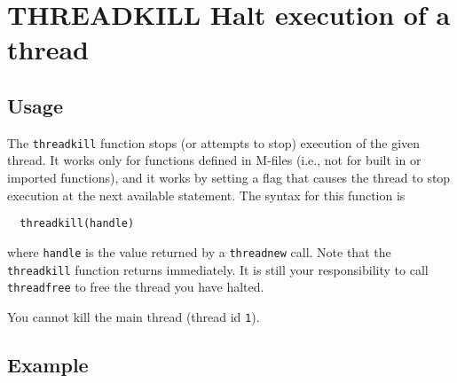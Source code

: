 \section{THREADKILL Halt execution of a thread}

\subsection{Usage}

The \verb|threadkill| function stops (or attempts to stop) execution
of the given thread.  It works only for functions defined in M-files
(i.e., not for built in or imported functions), and it works by 
setting a flag that causes the thread to stop execution at the next
available statement.  The syntax for this function is 
\begin{verbatim}
  threadkill(handle)
\end{verbatim}
where \verb|handle| is the value returned by a \verb|threadnew| call.  
Note that the \verb|threadkill| function returns immediately.  It 
is still your responsibility to call \verb|threadfree| to free
the thread you have halted.

You cannot kill the main thread (thread id \verb|1|).
\subsection{Example}

